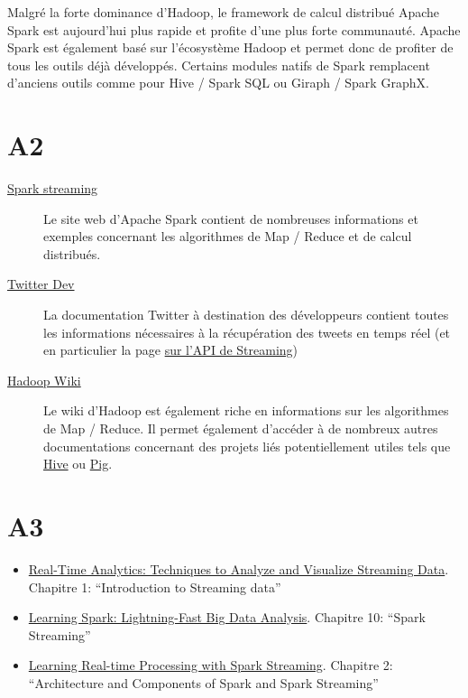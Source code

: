     Malgré la forte dominance d'Hadoop, le framework de calcul distribué Apache Spark est aujourd'hui plus rapide et profite d'une plus forte communauté. Apache Spark est également basé sur l'écosystème Hadoop et permet donc de profiter de tous les outils déjà développés. Certains modules natifs de Spark remplacent d'anciens outils comme pour Hive / Spark SQL ou Giraph / Spark GraphX.


\section{A2}
  \begin{description}
    \item[\href{http://spark.apache.org/streaming/}{Spark streaming}] Le site web d'Apache Spark contient de nombreuses informations et exemples concernant les algorithmes de Map / Reduce et de calcul distribués.
    \item[\href{https://dev.twitter.com}{Twitter Dev}] La documentation Twitter à destination des développeurs contient toutes les informations nécessaires à la récupération des tweets en temps réel (et en particulier la page \href{https://dev.twitter.com/streaming/overview}{sur l'API de Streaming})
    \item[\href{http://wiki.apache.org/hadoop}{Hadoop Wiki}] Le wiki d'Hadoop est également riche en informations sur les algorithmes de Map / Reduce. Il permet également d'accéder à de nombreux autres documentations concernant des projets liés potentiellement utiles tels que \href{https://cwiki.apache.org/confluence/display/Hive/Home}{Hive} ou \href{https://cwiki.apache.org/confluence/display/PIG/Index}{Pig}.
  \end{description}

\section{A3}
  \begin{itemize}
    \item \href{http://www.amazon.fr/Real-Time-Analytics-Techniques-Visualize-Streaming/dp/1118837916/ref=sr_1_7?s=english-books&ie=UTF8&qid=1446301986&sr=1-7&keywords=streaming}{Real-Time Analytics: Techniques to Analyze and Visualize Streaming Data}. Chapitre 1: ``Introduction to Streaming data''
    \item \href{http://www.amazon.com/Learning-Spark-Lightning-Fast-Data-Analysis/dp/1449358624/ref=sr_1_1?ie=UTF8&qid=1446301706&sr=8-1&keywords=apache+spark}{Learning Spark: Lightning-Fast Big Data Analysis}. Chapitre 10: ``Spark Streaming''
    \item \href{http://www.amazon.fr/Learning-Real-time-Processing-Spark-Streaming-ebook/dp/B015Q7I3NM/ref=sr_1_2?s=english-books&ie=UTF8&qid=1446301986&sr=1-2&keywords=streaming}{Learning Real-time Processing with Spark Streaming}. Chapitre 2: ``Architecture and Components of Spark and Spark Streaming''
  \end{itemize}

